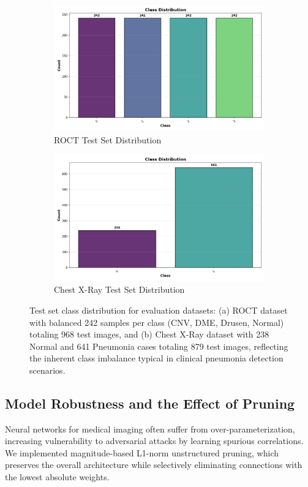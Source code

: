 \documentclass[preprint,12pt]{elsarticle}
\begin{document}
\begin{figure}[!t]
\centering
\begin{subfigure}[b]{0.45\columnwidth}
\centering
\includegraphics[width=\columnwidth]{fig/class_distribution_roct.png}
\caption{ROCT Test Set Distribution}
\end{subfigure}
\hfill
\begin{subfigure}[b]{0.45\columnwidth}
\centering
\includegraphics[width=\columnwidth]{fig/class_distribution_chest_xray.png}
\caption{Chest X-Ray Test Set Distribution}
\end{subfigure}
\caption{Test set class distribution for evaluation datasets: (a) ROCT dataset with balanced 242 samples per class (CNV, DME, Drusen, Normal) totaling 968 test images, and (b) Chest X-Ray dataset with 238 Normal and 641 Pneumonia cases totaling 879 test images, reflecting the inherent class imbalance typical in clinical pneumonia detection scenarios.}
\label{fig:class_distribution}
\end{figure}

\subsection{Model Robustness and the Effect of Pruning}
Neural networks for medical imaging often suffer from over-parameterization, increasing vulnerability to adversarial attacks by learning spurious correlations. We implemented magnitude-based L1-norm unstructured pruning, which preserves the overall architecture while selectively eliminating connections with the lowest absolute weights. 
\end{document}
